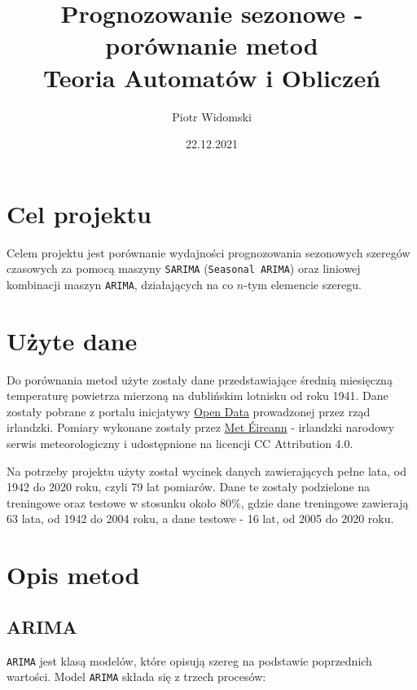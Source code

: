 \documentclass[12pt]{article}
\title{Prognozowanie sezonowe - porównanie metod \\
    \large Teoria Automatów i Obliczeń \\}
\author{Piotr Widomski}
\date{22.12.2021}
\begin{document}
\maketitle

\section{Cel projektu}

Celem projektu jest porównanie wydajności prognozowania sezonowych szeregów czasowych za pomocą maszyny \texttt{SARIMA} (\texttt{Seasonal ARIMA}) oraz liniowej kombinacji maszyn \texttt{ARIMA}, działających na co $n$-tym elemencie szeregu.

\section{Użyte dane}

Do porównania metod użyte zostały dane przedstawiające średnią miesięczną temperaturę powietrza mierzoną na dublińskim lotnisku od roku 1941. Dane zostały pobrane z portalu inicjatywy \href{https://data.gov.ie/dataset/dublin-airport-monthly-data?package_type=dataset}{Open Data} prowadzonej przez rząd irlandzki. Pomiary wykonane zostały przez \href{https://www.met.ie/}{Met Éireann} - irlandzki narodowy serwis meteorologiczny i udostępnione na licencji CC Attribution 4.0.

Na potrzeby projektu użyty został wycinek danych zawierających pełne lata, od 1942 do 2020 roku, czyli 79 lat pomiarów. Dane te zostały podzielone na treningowe oraz testowe w stosunku około $80\%$, gdzie dane treningowe zawierają 63 lata, od 1942 do 2004 roku, a dane testowe - 16 lat, od 2005 do 2020 roku.

\section{Opis metod}

\subsection{ARIMA}

\texttt{ARIMA} jest klasą modelów, które opisują szereg na podstawie poprzednich wartości. Model \texttt{ARIMA} składa się z trzech procesów:
\end{document}
